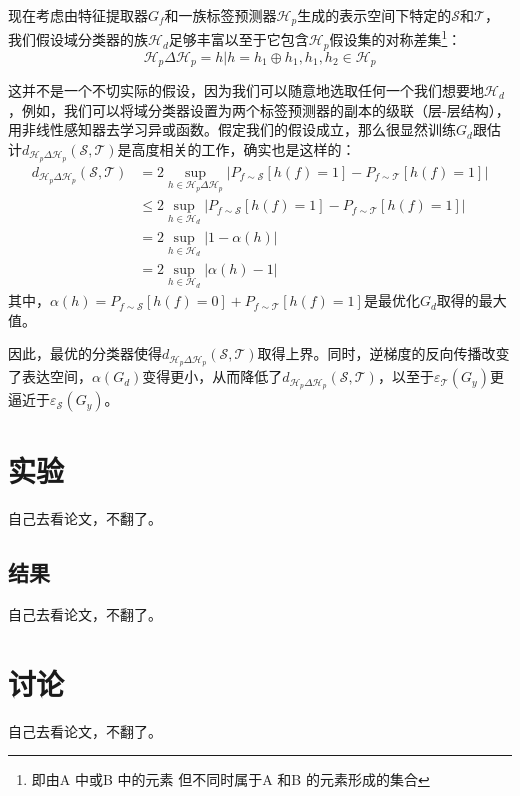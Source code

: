 \documentclass[UTF8]{ctexart}
\begin{document}
现在考虑由特征提取器$G_f$和一族标签预测器$\mathcal{H}_p$生成的表示空间下特定的$\mathcal{S}$和$\mathcal{T}$，我们假设域分类器的族$\mathcal{H}_d$足够丰富以至于它包含$\mathcal{H}_p$假设集的对称差集\footnote{即由A 中或B 中的元素 但不同时属于A 和B 的元素形成的集合}：
\begin{equation}
\mathcal{H}_p\Delta\mathcal{H}_p = {h|h=h_1\oplus h_1, h_1, h_2 \in \mathcal{H}_p}
\end{equation}

这并不是一个不切实际的假设，因为我们可以随意地选取任何一个我们想要地$\mathcal{H}_d$，例如，我们可以将域分类器设置为两个标签预测器的副本的级联（层-层结构），用非线性感知器去学习异或函数。假定我们的假设成立，那么很显然训练$G_d$跟估计$d_{\mathcal{H}_p\Delta\mathcal{H}_p}(\mathcal{S}, \mathcal{T}) $是高度相关的工作，确实也是这样的：
\begin{equation}
\begin{split}
d_{\mathcal{H}_p\Delta\mathcal{H}_p}(\mathcal{S}, \mathcal{T}) &= 
2 \sup\limits_{h\in \mathcal{H}_p\Delta\mathcal{H}_p} | P_{f\sim \mathcal{S}}[h(f) = 1] - P_{f\sim \mathcal{T}}[h(f) = 1] | \\
& \leq 2 \sup\limits_{h\in \mathcal{H}_d} | P_{f\sim \mathcal{S}}[h(f) = 1] - P_{f\sim \mathcal{T}}[h(f) = 1] | \\
& = 2 \sup\limits_{h\in \mathcal{H}_d} | 1 - \alpha(h) |  \\
& =  2 \sup\limits_{h\in \mathcal{H}_d} | \alpha(h) - 1| 
\end{split}
\end{equation}
其中，$\alpha(h) = P_{f\sim\mathcal{S}}[h(f) = 0] + P_{f\sim\mathcal{T}}[h(f) = 1]$是最优化$G_d$取得的最大值。

因此，最优的分类器使得$d_{\mathcal{H}_p\Delta\mathcal{H}_p}(\mathcal{S}, \mathcal{T})$取得上界。同时，逆梯度的反向传播改变了表达空间，$\alpha(G_d)$变得更小，从而降低了$d_{\mathcal{H}_p\Delta\mathcal{H}_p}(\mathcal{S}, \mathcal{T})$，以至于$\varepsilon_\mathcal{T}(G_y)$更逼近于$\varepsilon_\mathcal{S}(G_y)$。


\section{实验}
自己去看论文，不翻了。

\subsection{结果}
自己去看论文，不翻了。
\section{讨论}
自己去看论文，不翻了。
\end{document}
